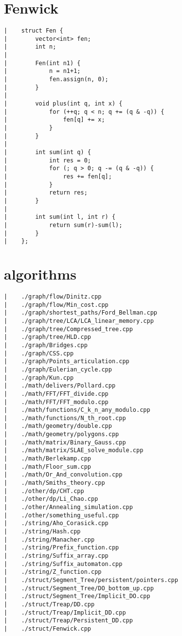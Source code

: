 \documentclass[a4paper, 10pt]{article}
\begin{document}
\begin{center}
\section*{Fenwick}
\begin{verbatim}
|    struct Fen {
|        vector<int> fen;
|        int n;
|    
|        Fen(int n1) {
|            n = n1+1;
|            fen.assign(n, 0);
|        }
|    
|        void plus(int q, int x) {
|            for (++q; q < n; q += (q & -q)) {
|                fen[q] += x;
|            }
|        }
|    
|        int sum(int q) {
|            int res = 0;
|            for (; q > 0; q -= (q & -q)) {
|                res += fen[q];
|            }
|            return res;
|        }
|    
|        int sum(int l, int r) {
|            return sum(r)-sum(l);
|        }
|    };
\end{verbatim}

\newpage

\section*{algorithms}
\begin{verbatim}
|    ./graph/flow/Dinitz.cpp
|    ./graph/flow/Min_cost.cpp
|    ./graph/shortest_paths/Ford_Bellman.cpp
|    ./graph/tree/LCA/LCA_linear_memory.cpp
|    ./graph/tree/Compressed_tree.cpp
|    ./graph/tree/HLD.cpp
|    ./graph/Bridges.cpp
|    ./graph/CSS.cpp
|    ./graph/Points_articulation.cpp
|    ./graph/Eulerian_cycle.cpp
|    ./graph/Kun.cpp
|    ./math/delivers/Pollard.cpp
|    ./math/FFT/FFT_divide.cpp
|    ./math/FFT/FFT_modulo.cpp
|    ./math/functions/C_k_n_any_modulo.cpp
|    ./math/functions/N_th_root.cpp
|    ./math/geometry/double.cpp
|    ./math/geometry/polygons.cpp
|    ./math/matrix/Binary_Gauss.cpp
|    ./math/matrix/SLAE_solve_module.cpp
|    ./math/Berlekamp.cpp
|    ./math/Floor_sum.cpp
|    ./math/Or_And_convolution.cpp
|    ./math/Smiths_theory.cpp
|    ./other/dp/CHT.cpp
|    ./other/dp/Li_Chao.cpp
|    ./other/Annealing_simulation.cpp
|    ./other/something_useful.cpp
|    ./string/Aho_Corasick.cpp
|    ./string/Hash.cpp
|    ./string/Manacher.cpp
|    ./string/Prefix_function.cpp
|    ./string/Suffix_array.cpp
|    ./string/Suffix_automaton.cpp
|    ./string/Z_function.cpp
|    ./struct/Segment_Tree/persistent/pointers.cpp
|    ./struct/Segment_Tree/DO_bottom_up.cpp
|    ./struct/Segment_Tree/Implicit_DO.cpp
|    ./struct/Treap/DD.cpp
|    ./struct/Treap/Implicit_DD.cpp
|    ./struct/Treap/Persistent_DD.cpp
|    ./struct/Fenwick.cpp
\end{verbatim}

\end{center}
\end{document}
